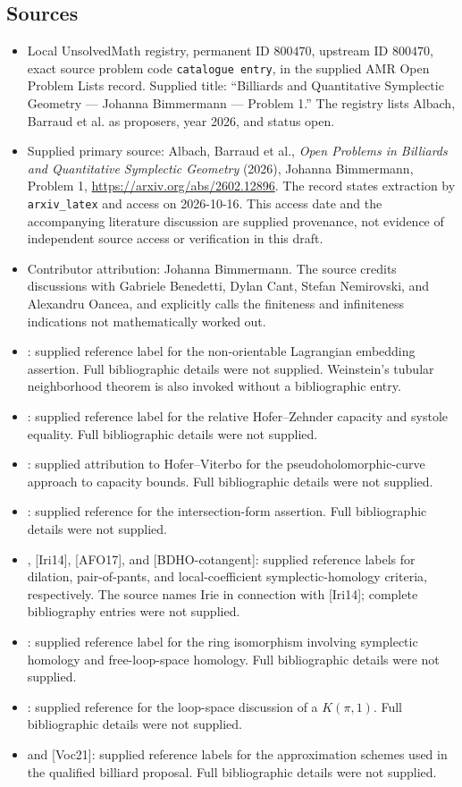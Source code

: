 \documentclass[11pt]{article}
\begin{document}
\subsection{Sources}
\begin{itemize}
\item Local UnsolvedMath registry, permanent ID \(800470\), upstream ID \(800470\), exact source problem code \texttt{catalogue entry}, in the supplied AMR Open Problem Lists record. Supplied title: ``Billiards and Quantitative Symplectic Geometry --- Johanna Bimmermann --- Problem 1.'' The registry lists Albach, Barraud et al. as proposers, year 2026, and status open.
\item Supplied primary source: Albach, Barraud et al., \emph{Open Problems in Billiards and Quantitative Symplectic Geometry} (2026), Johanna Bimmermann, Problem 1, \url{https://arxiv.org/abs/2602.12896}. The record states extraction by \texttt{arxiv\_latex} and access on 2026-10-16. This access date and the accompanying literature discussion are supplied provenance, not evidence of independent source access or verification in this draft.
\item Contributor attribution: Johanna Bimmermann. The source credits discussions with Gabriele Benedetti, Dylan Cant, Stefan Nemirovski, and Alexandru Oancea, and explicitly calls the finiteness and infiniteness indications not mathematically worked out.
\item [Giv86]: supplied reference label for the non-orientable Lagrangian embedding assertion. Full bibliographic details were not supplied. Weinstein's tubular neighborhood theorem is also invoked without a bibliographic entry.
\item [Wbr06]: supplied reference label for the relative Hofer--Zehnder capacity and systole equality. Full bibliographic details were not supplied.
\item [HV92]: supplied attribution to Hofer--Viterbo for the pseudoholomorphic-curve approach to capacity bounds. Full bibliographic details were not supplied.
\item [Bea96, Proposition III.18]: supplied reference for the intersection-form assertion. Full bibliographic details were not supplied.
\item [BC25], [Iri14], [AFO17], and [BDHO-cotangent]: supplied reference labels for dilation, pair-of-pants, and local-coefficient symplectic-homology criteria, respectively. The source names Irie in connection with [Iri14]; complete bibliography entries were not supplied.
\item [Abo15]: supplied reference label for the ring isomorphism involving symplectic homology and free-loop-space homology. Full bibliographic details were not supplied.
\item [LO15, Chapter 1.4]: supplied reference for the loop-space discussion of a \(K(\pi,1)\). Full bibliographic details were not supplied.
\item [AM11] and [Voc21]: supplied reference labels for the approximation schemes used in the qualified billiard proposal. Full bibliographic details were not supplied.
\end{itemize}
\end{document}
